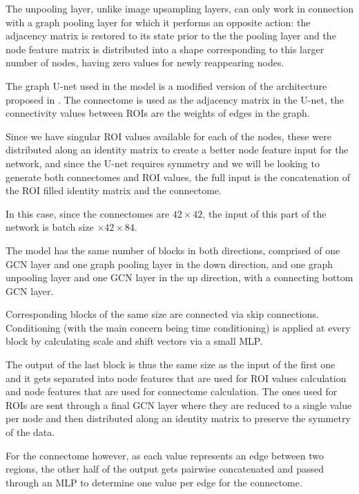 	
	The unpooling layer, unlike image upsampling layers, can only work in connection with a graph pooling layer for which it performs an opposite action: the adjacency matrix is restored to its state prior to the the pooling layer and the node feature matrix is distributed into a shape corresponding to this larger number of nodes, having zero values for newly reappearing nodes.
	
	The graph U-net used in the model is a modified version of the architecture proposed in \cite{graph-u-net}. The connectome is used as the adjacency matrix in the U-net, the connectivity values between ROIs are the weights of edges in the graph. 
	
	Since we have singular ROI values available for each of the nodes, these were distributed along an identity matrix to create a better node feature input for the network, and since the U-net requires symmetry and we will be looking to generate both connectomes and ROI values, the full input is the concatenation of the ROI filled identity matrix and the connectome. 
	
	In this case, since the connectomes are $42 \times 42$, the input of this part of the network is batch size $\times 42 \times 84$.
	
	
	The model has the same number of blocks in both directions, comprised of one GCN layer and one graph pooling layer in the down direction, and one graph unpooling layer and one GCN layer in the up direction, with a connecting bottom GCN layer. 
	
	Corresponding blocks of the same size are connected via skip connections. Conditioning (with the main concern being time conditioning) is applied at every block by calculating scale and shift vectors via a small MLP.
	
	
	The output of the last block is thus the same size as the input of the first one and it gets separated into node features that are used for ROI values calculation and node features that are used for connectome calculation. The ones used for ROIs are sent through a final GCN layer where they are reduced to a single value per node and then distributed along an identity matrix to preserve the symmetry of the data. 
	
	For the connectome however, as each value represents an edge between two regions, the other half of the output gets pairwise concatenated and passed through an MLP to determine one value per edge for the connectome.
	
